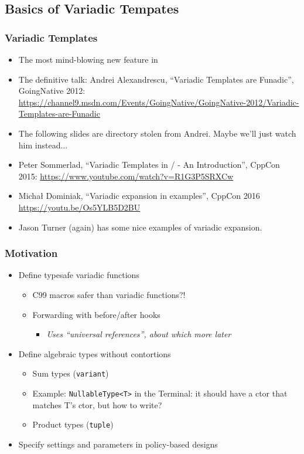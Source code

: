\subsection{Basics of Variadic Tempates}
\begin{frame}[fragile,t]
\frametitle{Variadic Templates}
\begin{itemize}[<+->]
\item The most mind-blowing new feature in 
\item The definitive talk: Andrei Alexandrescu, ``Variadic Templates
  are Funadic'', GoingNative 2012:
  \url{https://channel9.msdn.com/Events/GoingNative/GoingNative-2012/Variadic-Templates-are-Funadic}
\item The following slides are directory stolen from Andrei.  Maybe
  we'll just watch him instead...
\item Peter Sommerlad, ``Variadic Templates in  /  - An
  Introduction'', CppCon 2015: \url{https://www.youtube.com/watch?v=R1G3P5SRXCw}
\item Micha\l{} Dominiak, ``Variadic expansion in examples'', CppCon 2016 \url{https://youtu.be/Os5YLB5D2BU}
\item Jason Turner (again) has some nice examples of variadic expansion.
\end{itemize}
\end{frame}


\begin{frame}[fragile,t]
\frametitle{Motivation}
\begin{itemize}[<+->]
\item Define typesafe variadic functions
  \begin{itemize}
    \item C99 macros safer than  variadic functions?!
    \item Forwarding with before/after hooks
    \begin{itemize}  \item \emph{Uses ``universal references'', about
        which more later}
  \end{itemize}
  \end{itemize}
\item Define algebraic types without contortions
  \begin{itemize}[<+->]
  \item Sum types (\texttt{variant})
    \item Example: \texttt{NullableType<T>} in the Terminal: it should
      have a ctor that matches T's ctor, but how to write?
  \item Product types (\texttt{tuple})
  \end{itemize}
\item Specify settings and parameters in policy-based designs
\end{itemize}
\end{frame}


